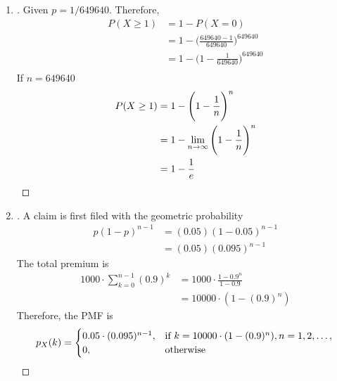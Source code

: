 \documentclass[paper=usletter, fontsize=12pt]{article}
\begin{document}
\begin{enumerate}
        \item
        \begin{proof}[\unskip\nopunct]
            Given $p = 1/649640$.
            Therefore,
            \begingroup
            \addtolength{\jot}{1em}
            \begin{align*}
                P(X \ge 1) & = 1 - P(X = 0)\\
                & = 1 - \Bigg(\frac{649640-1}{649640}\Bigg)^{649640}\\
                & = 1 - \Bigg(1 - \frac{1}{649640}\Bigg)^{649640}\\
            \end{align*}
            If $n = 649640$
            \begin{align*}
                P(X \ge 1) & = 1 - \Bigg(1 - \frac{1}{n}\Bigg)^{n}\\
                & = 1 - \lim_{n \rightarrow \infty}\Bigg(1 -
                \frac{1}{n}\Bigg)^{n}\\
                & = 1 - \frac{1}{e} \qedhere
            \end{align*}
            \endgroup
        \end{proof}
        \vspace{0.2in}

        \item
        \begin{proof}[\unskip\nopunct]
            A claim is first filed with the geometric probability
            \begin{align*}
                p(1-p)^{n-1} & = (0.05)(1 - 0.05)^{n-1}\\
                & =(0.05)(0.095)^{n-1}
            \end{align*}
            The total premium is
            \begin{align*}
                1000 \cdot \sum_{k=0}^{n-1} (0.9)^k & = 1000 \cdot \frac{1-0.9^n}{1-0.9}\\
                & = 10000 \cdot (1-(0.9)^n)
            \end{align*}
            Therefore, the PMF is
            \begin{equation*}
                p_X(k) =
                \begin{cases}
                    0.05 \cdot (0.095)^{n-1}, & \text{if}\ k = 10000 \cdot (1-(0.9)^n), n = 1,2, \ldots,\\
                    0, & \text{otherwise}
                \end{cases} \qedhere
            \end{equation*}
        \end{proof}
        \vspace{0.2in}


\end{enumerate}
\end{document}
